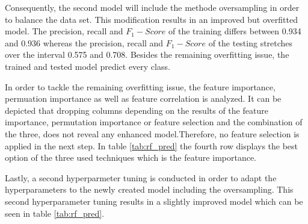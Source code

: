 Consequently, the second model will include the methode oversampling in order to balance the data set. This modification results in an improved but overfitted model. The precision, recall and $F_1-Score$ of the training differs between 0.934 and 0.936 whereas the precision, recall and $F_1-Score$ of the testing stretches over the interval 0.575 and 0.708. Besides the remaining overfitting issue, the trained and tested model predict every class.

In order to tackle the remaining overfitting issue, the feature importance, permuation importance as well as feature correlation is analyzed.\cite[cf.][]{Piotri2020} It can be depicted that dropping columns depending on the results of the feature importance, permutation importance or feature selection and the combination of the three, does not reveal any enhanced model.Therefore, no feature selection is applied in the next step. In table \ref{tab:rf_pred} the fourth row displays the best option of the three used techniques which is the feature importance.

Lastly, a second hyperparmeter tuning is conducted in order to adapt the hyperparameters to the newly created model including the oversampling. 
This second hyperparameter tuning results in a slightly improved model which can be seen in table \ref{tab:rf_pred}.




